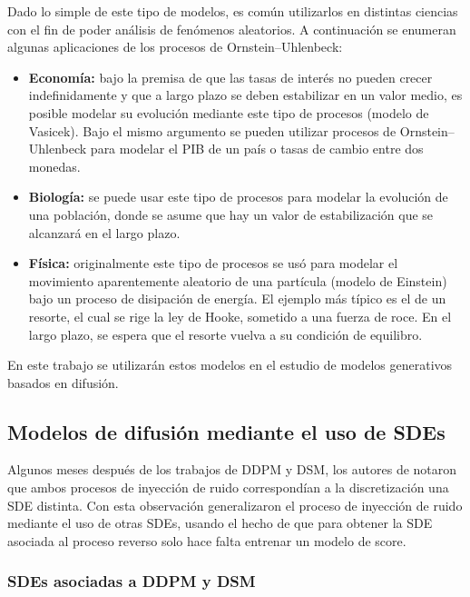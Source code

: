 Dado lo simple de este tipo de modelos, es común utilizarlos en distintas ciencias con el fin de poder análisis de fenómenos aleatorios. A continuación se enumeran algunas aplicaciones de los procesos de Ornstein–Uhlenbeck:

\begin{itemize}
    \item \textbf{Economía:} bajo la premisa de que las tasas de interés no pueden crecer indefinidamente y que a largo plazo se deben estabilizar en un valor medio, es posible modelar su evolución mediante este tipo de procesos (modelo de Vasicek). Bajo el mismo argumento se pueden utilizar procesos de Ornstein–Uhlenbeck para modelar el PIB de un país o tasas de cambio entre dos monedas.
    \item \textbf{Biología:} se puede usar este tipo de procesos para modelar la evolución de una población, donde se asume que hay un valor de estabilización que se alcanzará en el largo plazo.
    \item \textbf{Física:} originalmente este tipo de procesos se usó para modelar el movimiento aparentemente aleatorio de una partícula (modelo de Einstein) bajo un proceso de disipación de energía. El ejemplo más típico es el de un resorte, el cual se rige la ley de Hooke, sometido a una fuerza de roce. En el largo plazo, se espera que el resorte vuelva a su condición de equilibro.
\end{itemize}

En este trabajo se utilizarán estos modelos en el estudio de modelos generativos basados en difusión.

\subsection{Modelos de difusión mediante el uso de SDEs}
\label{dm/continuous_dm/sde}

Algunos meses después de los trabajos de DDPM y DSM, los autores de \cite{song2021scorebased} notaron que ambos procesos de inyección de ruido correspondían a la discretización una SDE distinta. Con esta observación generalizaron el proceso de inyección de ruido mediante el uso de otras SDEs, usando el hecho de que para obtener la SDE asociada al proceso reverso solo hace falta entrenar un modelo de score.

\subsubsection{SDEs asociadas a DDPM y DSM}

